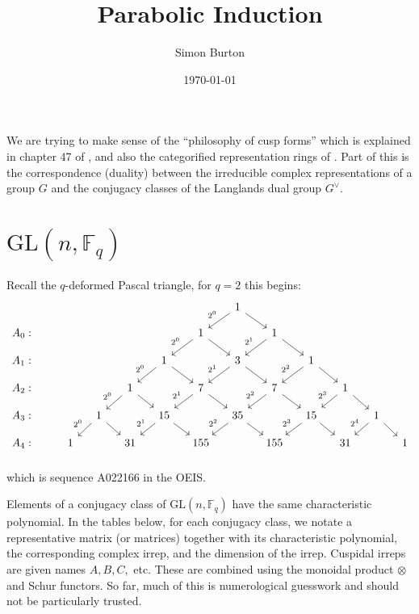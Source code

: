\documentclass[11pt,oneside]{article}
\title{Parabolic Induction}
\author{Simon Burton}
\date{\today}
\newcommand{\GL}{\mathrm{GL}}
\newcommand{\Field}{\mathbb{F}}
\newcommand{\tensor}{\otimes}
\begin{document}
\maketitle

We are trying to make sense of the ``philosophy of cusp forms''
which is explained in chapter 47 of \cite{Bump2004},
and also the categorified representation rings of \cite{Joyal1995}.
Part of this is the correspondence (duality)
between the irreducible complex
representations of a group $G$ and the 
conjugacy classes of the Langlands dual group $G^{\vee}$.

\section{$\GL(n,\Field_q)$}

Recall the $q$-deformed Pascal triangle, for $q=2$ this begins:
$$
\begin{tikzcd}[column sep=small, row sep=small]
 &  &  &  &  &  &  & 1\arrow[dl, swap, "2^0"]\arrow[dr] &  &  &  &  &  \\
A_0: &  &  &  &  &  & 1\arrow[dl, swap, "2^{0}"]\arrow[dr] &  & 1\arrow[dl, swap, "2^{1}"]\arrow[dr] &  &  &  &  \\
A_1: &  &  &  &  & 1\arrow[dl, swap, "2^{0}"]\arrow[dr] &  & 3\arrow[dl, swap, "2^{1}"]\arrow[dr] &  & 1\arrow[dl, swap, "2^{2}"]\arrow[dr] &  &  &  \\
A_2: &  &  &  & 1\arrow[dl, swap, "2^{0}"]\arrow[dr] &  & 7\arrow[dl, swap, "2^{1}"]\arrow[dr] &  & 7\arrow[dl, swap, "2^{2}"]\arrow[dr] &  & 1\arrow[dl, swap, "2^{3}"]\arrow[dr] &  &  \\
A_3: &  &  & 1\arrow[dl, swap, "2^{0}"]\arrow[dr] &  & 15\arrow[dl, swap, "2^{1}"]\arrow[dr] &  & 35\arrow[dl, swap, "2^{2}"]\arrow[dr] &  & 15\arrow[dl, swap, "2^{3}"]\arrow[dr] &  & 1\arrow[dl, swap, "2^{4}"]\arrow[dr] &  \\
A_4: &  & 1 &  & 31 &  & 155 &  & 155 &  & 31 &  & 1 \\
\end{tikzcd}
$$
which is sequence A022166 in the OEIS.

Elements of a 
conjugacy class of $\GL(n,\Field_q)$ have the same characteristic polynomial.
In the tables below, for each conjugacy class,
we notate a representative matrix (or matrices) together with its
characteristic polynomial, the corresponding complex irrep,
and the dimension of the irrep.
Cuspidal irreps are given names $A, B, C,$ etc.
These are combined using the monoidal product
$\tensor$ and Schur functors.
So far, much of this is numerological guesswork and should not be particularly trusted.
\end{document}
